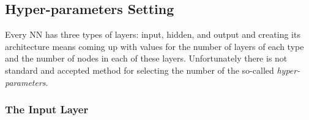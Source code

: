 %

\subsection{Hyper-parameters Setting}
\label{neural-network-design}

%
%

Every NN has three types of layers: input, hidden, and output and creating its architecture means coming up with values for the number of layers of each type and the number of nodes in each of these layers.
Unfortunately there is not standard and accepted method for selecting the number of the so-called \emph{hyper-parameters}. 

\subsubsection*{The Input Layer}

